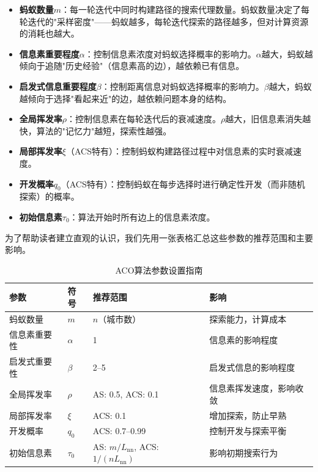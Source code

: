 \documentclass[lang=cn,zihao=-4,a4paper,fontset=windows]{beautybook}
\begin{document}
\begin{itemize}
    \item \textbf{蚂蚁数量$m$}：每一轮迭代中同时构建路径的搜索代理数量。蚂蚁数量决定了每轮迭代的"采样密度"——蚂蚁越多，每轮迭代探索的路径越多，但对计算资源的消耗也越大。
    \item \textbf{信息素重要程度$\alpha$}：控制信息素浓度对蚂蚁选择概率的影响力。$\alpha$越大，蚂蚁越倾向于追随"历史经验"（信息素高的边），越依赖已有信息。
    \item \textbf{启发式信息重要程度$\beta$}：控制距离信息对蚂蚁选择概率的影响力。$\beta$越大，蚂蚁越倾向于选择"看起来近"的边，越依赖问题本身的结构。
    \item \textbf{全局挥发率$\rho$}：控制信息素在每轮迭代后的衰减速度。$\rho$越大，旧信息素消失越快，算法的"记忆力"越短，探索性越强。
    \item \textbf{局部挥发率$\xi$}（ACS特有）：控制蚂蚁构建路径过程中对信息素的实时衰减速度。
    \item \textbf{开发概率$q_0$}（ACS特有）：控制蚂蚁在每步选择时进行确定性开发（而非随机探索）的概率。
    \item \textbf{初始信息素$\tau_0$}：算法开始时所有边上的信息素浓度。
\end{itemize}

为了帮助读者建立直观的认识，我们先用一张表格汇总这些参数的推荐范围和主要影响。

\begin{table}[H]
\centering
\caption{ACO算法参数设置指南}
\begin{tabular}{p{}p{}p{}p{}}
\toprule
\textbf{参数} & \textbf{符号} & \textbf{推荐范围} & \textbf{影响} \\
\midrule
蚂蚁数量 & $m$ & $n$（城市数） & 探索能力，计算成本 \\
\hline
信息素重要性 & $\alpha$ & 1 & 信息素的影响程度 \\
\hline
启发式重要性 & $\beta$ & 2--5 & 启发式信息的影响程度 \\
\hline
全局挥发率 & $\rho$ & AS: 0.5, ACS: 0.1 & 信息素挥发速度，影响收敛 \\
\hline
局部挥发率 & $\xi$ & ACS: 0.1 & 增加探索，防止早熟 \\
\hline
开发概率 & $q_0$ & ACS: 0.7--0.99 & 控制开发与探索平衡 \\
\hline
初始信息素 & $\tau_0$ & AS: $m/L_{\text{nn}}$, ACS: $1/(nL_{\text{nn}})$ & 影响初期搜索行为 \\
\bottomrule
\end{tabular}
\end{table}
\end{document}
